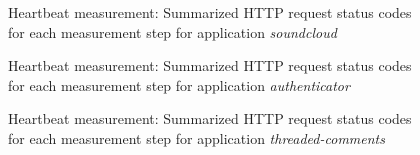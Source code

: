 \begin{figure}[ht]
  \caption{Heartbeat measurement: Summarized HTTP request status codes for each measurement step for application \emph{soundcloud}}
  \label{fig:heartbeat_soundcloud}
\end{figure}

\begin{figure}[ht]
  \caption{Heartbeat measurement: Summarized HTTP request status codes for each measurement step for application \emph{authenticator}}
  \label{fig:heartbeat_auth}
\end{figure}

\begin{figure}[ht]
  \caption{Heartbeat measurement: Summarized HTTP request status codes for each measurement step for application \emph{threaded-comments}}
  \label{fig:heartbeat_tr}
\end{figure}

